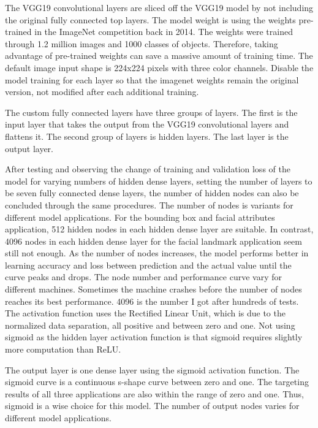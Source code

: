 \documentclass{article}
\begin{document}
The VGG19 convolutional layers are sliced off the VGG19 model by not including the original fully connected top layers. The model weight is using the weights pre-trained in the ImageNet competition back in 2014. The weights were trained through 1.2 million images and 1000 classes of objects. Therefore, taking advantage of pre-trained weights can save a massive amount of training time. The default image input shape is 224x224 pixels with three color channels. Disable the model training for each layer so that the imagenet weights remain the original version, not modified after each additional training.

The custom fully connected layers have three groups of layers. The first is the input layer that takes the output from the VGG19 convolutional layers and flattens it. The second group of layers is hidden layers. The last layer is the output layer.

After testing and observing the change of training and validation loss of the model for varying numbers of hidden dense layers, setting the number of layers to be seven fully connected dense layers, the number of hidden nodes can also be concluded through the same procedures. The number of nodes is variants for different model applications. For the bounding box and facial attributes application, 512 hidden nodes in each hidden dense layer are suitable. In contrast, 4096 nodes in each hidden dense layer for the facial landmark application seem still not enough. As the number of nodes increases, the model performs better in learning accuracy and loss between prediction and the actual value until the curve peaks and drops. The node number and performance curve vary for different machines. Sometimes the machine crashes before the number of nodes reaches its best performance. 4096 is the number I got after hundreds of tests. The activation function uses the Rectified Linear Unit, which is due to the normalized data separation, all positive and between zero and one. Not using sigmoid as the hidden layer activation function is that sigmoid requires slightly more computation than ReLU. 

The output layer is one dense layer using the sigmoid activation function. The sigmoid curve is a continuous s-shape curve between zero and one. The targeting results of all three applications are also within the range of zero and one. Thus, sigmoid is a wise choice for this model. The number of output nodes varies for different model applications.
\end{document}
